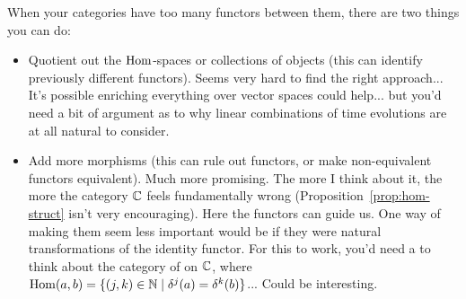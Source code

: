 \documentclass[11pt,a4paper]{amsart}
\begin{document}
When your categories have too many functors between them, there are two things you can do:
\begin{itemize}
\item Quotient out the $\operatorname{Hom}$-spaces or collections of objects (this can identify previously different functors). Seems very hard to find the right approach... It's possible enriching everything over vector spaces could help... but you'd need a bit of argument as to why linear combinations of time evolutions are at all natural to consider.
\item Add more morphisms (this can rule out functors, or make non-equivalent functors equivalent). Much more promising. The more I think about it, the more the category $\mathbb{C}$ feels fundamentally wrong (Proposition~\ref{prop:hom-struct} isn't very encouraging). Here the  functors can guide us. One way of making them seem less important would be if they were natural transformations of the identity functor. For this to work, you'd need a to think about the category of  on $\mathbb{C}$, where $\operatorname{Hom}(a,b) = \{(j,k) \in \mathbb{N} \mid \delta^j(a) = \delta^k(b)\}$... Could be interesting.  
\end{itemize}
\end{document}
